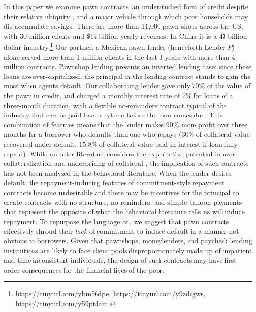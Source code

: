 \documentclass[oneside,11pt]{article}
\begin{document}
In this paper we examine pawn contracts, an understudied form of credit despite their relative ubiquity \citep{carter2012pawnshops}, and a major vehicle through which poor households may dis-accumulate savings.  There are more than 11,000 pawn shops across the US, with 30 million clients and \$14 billion yearly revenues.  In China it is a 43 billion dollar industry.\footnote{\url{https://tinyurl.com/ybm56dpe}, \url{https://tinyurl.com/y9zdcgws}, \url{https://tinyurl.com/y59ptdam}.} Our partner, a Mexican pawn lender (henceforth Lender $P$) alone served more than 1 million clients in the last 3 years with more than 4 million contracts.  Pawnshop lending presents an inverted lending case:  since these loans are over-capitalized, the principal in the lending contract stands to gain the most when agents default.  Our collaborating lender gave only 70\% of the value of the pawn in credit, and charged a monthly interest rate of 7\% for loans of a three-month duration, with a flexible no-reminders contract typical of the industry that can be paid back anytime before the loan comes due.  This combination of features means that the lender makes 90\% more profit over three months for a borrower who defaults than one who repays (30\% of collateral value recovered under default, 15.8\% of collateral value paid in interest if loan fully repaid).  While an older literature considers the exploitative potential in over-collateralization and underpricing of collateral \citep{basu1984implicit}, the implication of such contracts has not been analyzed in the behavioral literature.  When the lender desires default, the repayment-inducing features of commitment-style repayment contracts become undesirable and there may be incentives for the principal to create contracts with no structure, no reminders, and simple balloon payments that represent the opposite of what the behavioral literature tells us will induce repayment. To repurpose the language of \cite{Laibson2018}, we suggest that pawn contracts effectively shroud their \textit{lack} of commitment to induce default in a manner not obvious to borrowers.  Given that pawnshops, moneylenders, and paycheck lending institutions are likely to face client pools disproportionately made up of impatient and time-inconsistent individuals, the design of such contracts may have first-order consequences for the financial lives of the poor.
\end{document}
